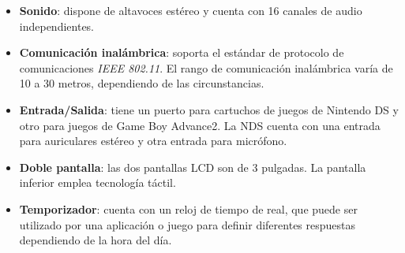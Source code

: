 \begin{itemize}
%
\item \textbf{Sonido}: dispone de altavoces estéreo y cuenta con 16 canales de audio independientes.
%
\item \textbf{Comunicación inalámbrica}: soporta el estándar de protocolo de comunicaciones \textit{IEEE 802.11}. El rango de comunicación inalámbrica varía de 10 a 30 metros, dependiendo de las circunstancias.
%
\item \textbf{Entrada/Salida}: tiene un puerto para cartuchos de juegos de Nintendo DS y otro para juegos de Game Boy Advance2. La NDS cuenta con una entrada para auriculares estéreo y otra entrada para micrófono.
%
\item \textbf{Doble pantalla}: las dos pantallas LCD son de 3 pulgadas. La pantalla inferior emplea tecnología táctil.
%
\item \textbf{Temporizador}: cuenta con un reloj de tiempo de real, que puede ser utilizado por una aplicación o juego para definir diferentes respuestas dependiendo de la hora del día.
\end{itemize}
